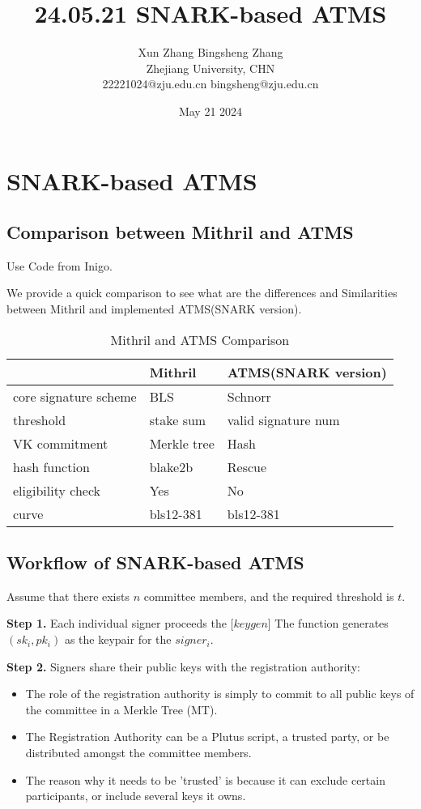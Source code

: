 \documentclass{article}
\title{24.05.21 SNARK-based ATMS}
\author{Xun Zhang \quad \quad Bingsheng Zhang \\ 
Zhejiang University, CHN \\
22221024@zju.edu.cn \quad bingsheng@zju.edu.cn}
\date{May 21 2024}
\begin{document}
\maketitle

\section{SNARK-based ATMS}


\subsection{Comparison between Mithril and ATMS}

Use Code from Inigo.


We provide a quick comparison to see what are the differences and Similarities between Mithril
and implemented ATMS(SNARK version).


\begin{table}[H]
    \centering
    \begin{tabular}{p{4cm}|p{3cm}|p{4cm}}    \hline
         &Mithril & ATMS(SNARK version) \\ \hline
         core signature scheme& BLS &Schnorr \\ \hline
         threshold& stake sum & valid signature num \\ \hline
         VK commitment& Merkle tree& Hash \\ \hline
         hash function& blake2b & Rescue \\ \hline
         eligibility check & Yes &No \\ \hline
         curve& bls12-381 &bls12-381 \\ \hline
    \end{tabular}
    \caption{Mithril and ATMS Comparison}
    \label{tab:my_label}
\end{table}


\subsection{Workflow of SNARK-based ATMS}
Assume that there exists $n$ committee members, and the required threshold is $t$.

\textbf{Step 1.} Each individual signer proceeds the [$keygen$]
The function generates $(sk_i, pk_i)$ as the keypair for the $signer_i$.

\textbf{Step 2.} Signers share their public keys with the registration authority:
\begin{itemize}
    \item The role of the registration authority is simply to commit to all public keys of the committee in a Merkle Tree (MT).
    \item The Registration Authority can be a Plutus script, a trusted party, or be distributed amongst the committee members.
    \item The reason why it needs to be 'trusted' is because it can exclude certain participants, or include several keys it owns.
\end{itemize}
\end{document}
